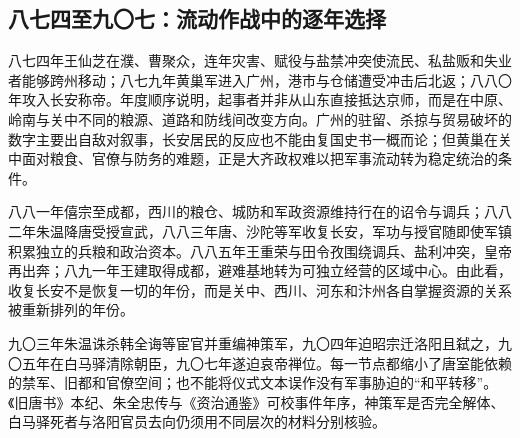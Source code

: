 \subsection{八七四至九〇七：流动作战中的逐年选择}

八七四年王仙芝在濮、曹聚众，连年灾害、赋役与盐禁冲突使流民、私盐贩和失业者能够跨州移动；八七九年黄巢军进入广州，港市与仓储遭受冲击后北返；八八〇年攻入长安称帝。年度顺序说明，起事者并非从山东直接抵达京师，而是在中原、岭南与关中不同的粮源、道路和防线间改变方向。广州的驻留、杀掠与贸易破坏的数字主要出自敌对叙事，长安居民的反应也不能由复国史书一概而论；但黄巢在关中面对粮食、官僚与防务的难题，正是大齐政权难以把军事流动转为稳定统治的条件。

八八一年僖宗至成都，西川的粮仓、城防和军政资源维持行在的诏令与调兵；八八二年朱温降唐受授宣武，八八三年唐、沙陀等军收复长安，军功与授官随即使军镇积累独立的兵粮和政治资本。八八五年王重荣与田令孜围绕调兵、盐利冲突，皇帝再出奔；八九一年王建取得成都，避难基地转为可独立经营的区域中心。由此看，收复长安不是恢复一切的年份，而是关中、西川、河东和汴州各自掌握资源的关系被重新排列的年份。

九〇三年朱温诛杀韩全诲等宦官并重编神策军，九〇四年迫昭宗迁洛阳且弑之，九〇五年在白马驿清除朝臣，九〇七年遂迫哀帝禅位。每一节点都缩小了唐室能依赖的禁军、旧都和官僚空间；也不能将仪式文本误作没有军事胁迫的“和平转移”。《旧唐书》本纪、朱全忠传与《资治通鉴》可校事件年序，神策军是否完全解体、白马驿死者与洛阳官员去向仍须用不同层次的材料分别核验。
